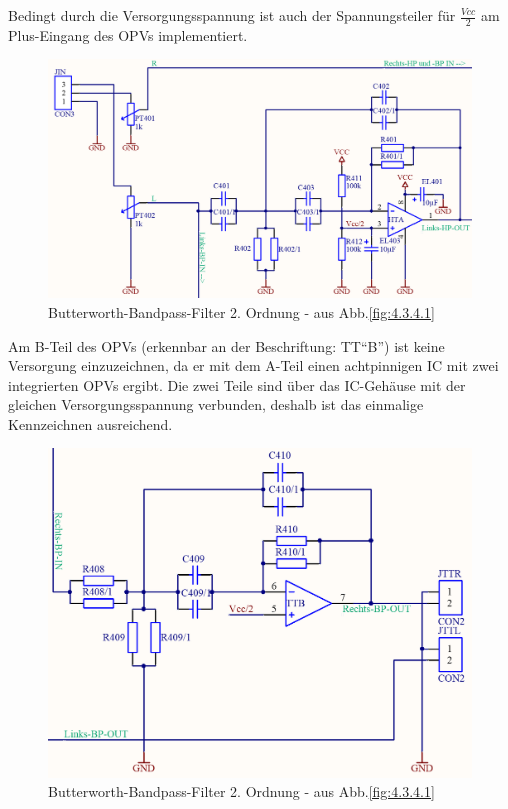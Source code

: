 Bedingt durch die Versorgungsspannung ist auch der Spannungsteiler für $\frac{Vcc}{2}$ am Plus-Eingang des OPVs implementiert.
\begin{figure} [H]
	\centering	
	\includegraphics[width=1\textwidth]{img/Print4/4_TTuHTWeiche-LinksHP-Schematic.PNG}
	\caption{Butterworth-Bandpass-Filter 2. Ordnung - aus Abb.\ref{fig:4.3.4.1}}
	\label {fig:4.3.4.2}
\end{figure}
Am B-Teil des OPVs (erkennbar an der Beschriftung: TT\enquote{B}) ist keine Versorgung einzuzeichnen, da er mit dem A-Teil einen achtpinnigen IC mit zwei integrierten OPVs ergibt. Die zwei Teile sind über das IC-Gehäuse mit der gleichen Versorgungsspannung verbunden, deshalb ist das einmalige Kennzeichnen ausreichend.\\
\begin{figure} [H]
	\centering	
	\includegraphics[width=1\textwidth]{img/Print4/4_TTuHTWeiche-RechtsBP-Schematic.PNG}
	\caption{Butterworth-Bandpass-Filter 2. Ordnung - aus Abb.\ref{fig:4.3.4.1}}
	\label {fig:4.3.4.3}
\end{figure}

